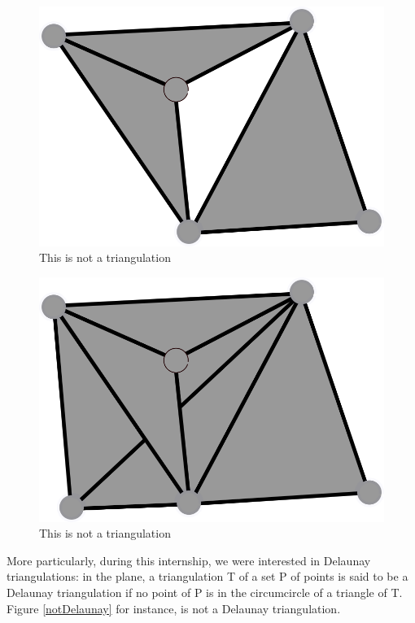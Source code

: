 \documentclass[a4paper,10pt]{article}
\begin{document}
\begin{figure}
  \centering
  \includegraphics[scale=2]{NotTrig1}
  \caption{\label{NotTrig1} This is not a triangulation}
\end{figure}

\begin{figure}
  \centering
  \includegraphics[scale=2]{NotTrig2}
  \caption{\label{NotTrig2} This is not a triangulation}
\end{figure}


More particularly, during this internship, we were interested in Delaunay triangulations: in the plane, a triangulation T of a set P of points is said to be a Delaunay triangulation if no point of P is in the circumcircle of a triangle of T. Figure \ref{notDelaunay} for instance, is not a Delaunay triangulation.
\end{document}
